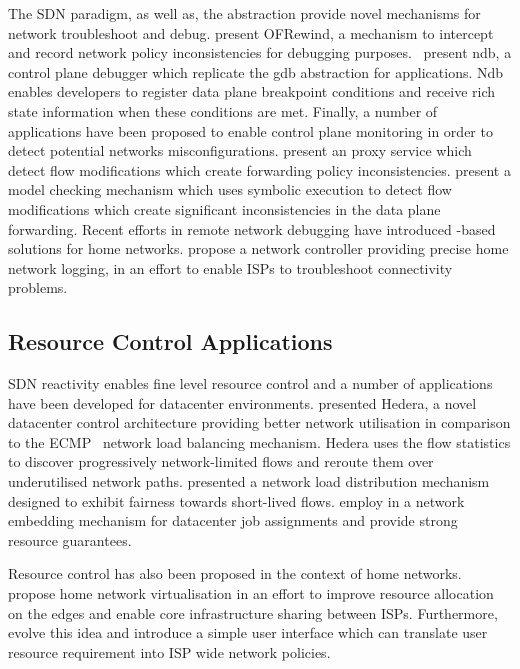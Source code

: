 The SDN paradigm, as well as, the \of abstraction provide novel mechanisms for
network troubleshoot and debug.  present OFRewind, a mechanism
to intercept and record network policy inconsistencies for debugging purposes.
~present ndb, a control plane debugger which replicate the
gdb abstraction for \of applications. Ndb enables developers to register data
plane breakpoint conditions and receive rich state information when these
conditions are met.  Finally, a number of applications have been proposed to
enable control plane monitoring in order to detect potential networks
misconfigurations.   present an \of proxy service which
detect flow modifications which create forwarding policy inconsistencies.
 present a model checking mechanism which uses symbolic
execution to detect flow modifications which create significant inconsistencies
in the data plane forwarding.  Recent efforts in remote network debugging have
introduced \of-based solutions for home networks.   propose a
network controller providing precise home network logging, in an effort to
enable ISPs to troubleshoot connectivity problems. 


\subsection{Resource Control Applications}

SDN reactivity enables fine level resource control and a number of applications
have been developed for datacenter environments.   presented
Hedera, a novel datacenter control architecture providing better network
utilisation in comparison to the ECMP~ network load balancing
mechanism. Hedera uses the \of flow statistics to discover progressively
network-limited flows and reroute them over underutilised network paths.
 presented a network load distribution mechanism designed to
exhibit fairness towards short-lived flows.  employ \of in a
network embedding mechanism for datacenter job assignments and provide strong
resource guarantees.

Resource control has also been proposed in the context of home networks.
 propose home network virtualisation in an effort to improve
resource allocation on the edges and enable core infrastructure sharing between
ISPs.  Furthermore,  evolve this idea and introduce a simple
user interface which can translate user resource requirement into ISP wide
network policies. 

